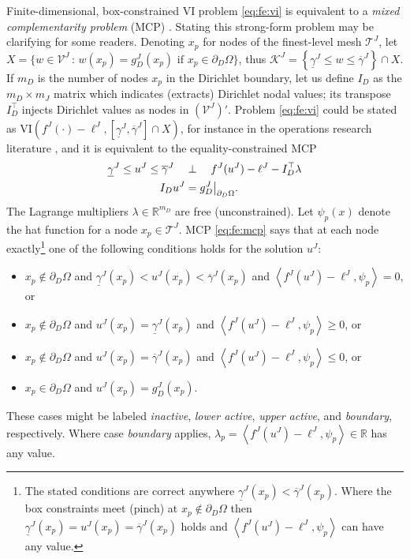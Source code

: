 \documentclass[letterpaper,final,12pt,reqno]{amsart}
\theoremstyle{cstyle}
\theoremstyle{cstyle*}
\theoremstyle{dstyle}
\numberwithin{equation}{section}
\numberwithin{figure}{section}
\numberwithin{table}{section}
\numberwithin{theorem}{section}
\newcommand{\RR}{\mathbb{R}}
\newcommand{\cK}{\mathcal{K}}
\newcommand{\cV}{\mathcal{V}}
\newcommand{\ip}[2]{\left<#1,#2\right>}
\begin{document}
Finite-dimensional, box-constrained VI problem \eqref{eq:fe:vi} is equivalent to a \emph{mixed complementarity problem} (MCP) \cite{FacchineiPang2003,FerrisPang1997}.  Stating this strong-form problem may be clarifying for some readers.  Denoting $x_p$ for nodes of the finest-level mesh $\mathcal{T}^J$, let $X=\big\{w\in\cV^J\,:\,w(x_p)=g_D^J(x_p) \text{ if } x_p\in \partial_D\Omega\big\}$, thus $\cK^J = \left\{\underline{\gamma}^J \le w \le \overline{\gamma}^J\right\} \cap X$.  If $m_D$ is the number of nodes $x_p$ in the Dirichlet boundary, let us define $I_D$ as the $m_D\times m_J$ matrix which indicates (extracts) Dirichlet nodal values; its transpose $I_D^\top$ injects Dirichlet values as nodes in $(\mathcal{V}^J)'$.  Problem \eqref{eq:fe:vi} could be stated as VI$\left(f^J(\cdot)-\ell^J,\left[\underline{\gamma}^J,\overline{\gamma}^J\right] \cap X\right)$, for instance in the operations research literature \cite{FerrisPang1997}, and it is equivalent to the equality-constrained MCP
\begin{align}
\underline{\gamma}^J \le u^J \le \overline{\gamma}^J \quad &\perp \quad f^J(u^J) - \ell^J - I_D^\top \lambda \label{eq:fe:mcp} \\
I_D u^J &= g_D^J\big|_{\partial_D\Omega}. \notag
\end{align}
The Lagrange multipliers $\lambda \in \RR^{m_D}$ are free (unconstrained).  Let $\psi_p(x)$ denote the hat function for a node $x_p \in \mathcal{T}^J$.  MCP \eqref{eq:fe:mcp} says that at each node exactly\footnote{The stated conditions are correct anywhere $\underline{\gamma}^J(x_p) < \overline{\gamma}^J(x_p)$.  Where the box constraints meet (pinch) at $x_p \notin \partial_D\Omega$ then $\underline{\gamma}^J(x_p)=u^J(x_p)=\overline{\gamma}^J(x_p)$ holds and $\ip{f^J(u^J)-\ell^J}{\psi_p}$ can have any value.} one of the following conditions holds for the solution $u^J$:
\begin{itemize}
\item $x_p \notin \partial_D\Omega$ and $\underline{\gamma}^J(x_p)<u^J(x_p)<\overline{\gamma}^J(x_p)$ and $\ip{f^J(u^J)-\ell^J}{\psi_p} = 0$, or
\item $x_p \notin \partial_D\Omega$ and $u^J(x_p)=\underline{\gamma}^J(x_p)$ and $\ip{f^J(u^J)-\ell^J}{\psi_p} \ge 0$, or
\item $x_p \notin \partial_D\Omega$ and $u^J(x_p)=\overline{\gamma}^J(x_p)$ and $\ip{f^J(u^J)-\ell^J}{\psi_p} \le 0$, or
\item $x_p \in \partial_D\Omega$ and $u^J(x_p)=g_D^J(x_p)$.
\end{itemize}
These cases might be labeled \emph{inactive}, \emph{lower active}, \emph{upper active}, and \emph{boundary}, respectively.  Where case \emph{boundary} applies, $\lambda_p=\ip{f^J(u^J)-\ell^J}{\psi_p}\in\RR$ has any value.
\end{document}
